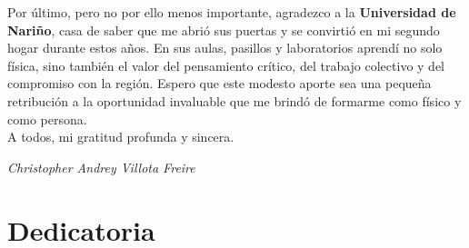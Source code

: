 \documentclass[12pt, spanish]{book}
\begin{document}
Por último, pero no por ello menos importante, agradezco a la \textbf{Universidad de Nariño}, casa de saber que me abrió sus puertas y se convirtió en mi segundo hogar durante estos años. En sus aulas, pasillos y laboratorios aprendí no solo física, sino también el valor del pensamiento crítico, del trabajo colectivo y del compromiso con la región. Espero que este modesto aporte sea una pequeña retribución a la oportunidad invaluable que me brindó de formarme como físico y como persona.\\

A todos, mi gratitud profunda y sincera.\\

\begin{flushright}
\textit{Christopher Andrey Villota Freire}
\end{flushright}

\vspace*{\fill}

\chapter*{Dedicatoria}

\vspace*{1.5cm}
\end{document}
